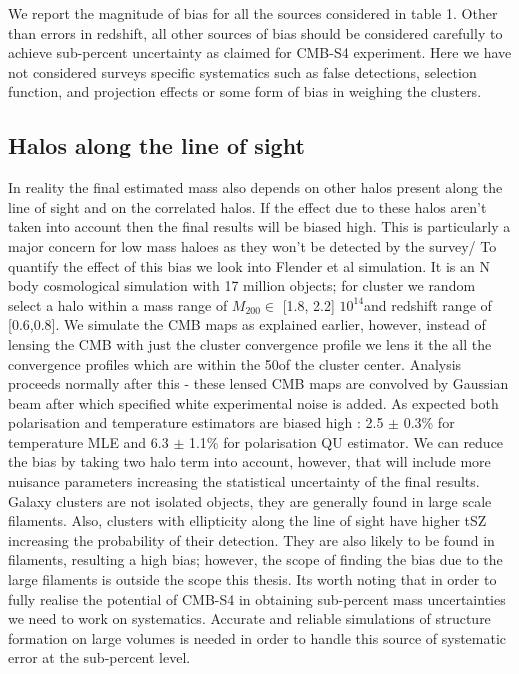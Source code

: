    We report the magnitude of bias for all the sources considered in table 1. 
 Other than errors in redshift, all other sources of bias should be considered carefully to achieve sub-percent uncertainty as claimed for CMB-S4 experiment. 
 Here we have not considered surveys specific systematics such as false detections, selection function, and projection effects or some form of bias in weighing the clusters.
 
 \subsection{Halos along the line of sight}
 In reality the final estimated mass also depends on other halos present along the line of sight and on the correlated halos. 
 If the effect due to these halos aren't taken into account then the final results will be biased high. 
 This is particularly a major concern for low mass haloes as they won't be detected by the survey/
 To quantify the effect of this bias we look into Flender et al simulation. 
 It is an N body cosmological simulation with 17 million objects; for cluster we random select a halo within a mass range of  $M_{200} \in$ [1.8, 2.2] $10^{14}$\msolar and redshift range of [0.6,0.8].
We simulate the CMB maps as explained earlier, however, instead of lensing the CMB with just the cluster convergence profile we lens it the all the convergence profiles which are within the 50\am of the cluster center. 
Analysis proceeds normally after this - these lensed CMB maps are convolved by Gaussian beam after which specified white experimental noise is added. 
As expected both polarisation and temperature estimators are biased high : 2.5 $\pm$ 0.3\% for temperature MLE and 6.3 $\pm$ 1.1\% for polarisation QU estimator.
We can reduce the bias by taking two halo term into account, however, that will include more nuisance parameters increasing the statistical uncertainty of the final results. 
Galaxy clusters are not isolated objects, they are generally found in large scale filaments. 
Also, clusters with ellipticity along the line of sight have higher tSZ increasing the probability of their detection. 
They are also likely to be found in filaments, resulting a high bias; however, the scope of finding the bias due to the large filaments is outside the scope this thesis. 
Its worth noting that in order to fully realise the potential of CMB-S4 in obtaining sub-percent mass uncertainties we need to work on systematics.
Accurate and reliable simulations of structure formation on large volumes is needed in order to handle this source of systematic error at the sub-percent level.


